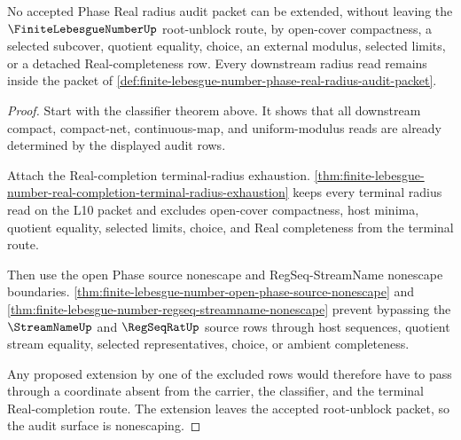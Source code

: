 \begin{theorem}
\label{thm:finite-lebesgue-number-phase-real-radius-audit-nonescape}
No accepted Phase Real radius audit packet can be extended, without leaving the $\FiniteLebesgueNumberUp$ root-unblock route, by open-cover compactness, a selected subcover, quotient equality, choice, an external modulus, selected limits, or a detached Real-completeness row. Every downstream radius read remains inside the packet of \autoref{def:finite-lebesgue-number-phase-real-radius-audit-packet}.
\end{theorem}
\begin{proof}
Start with the classifier theorem above. It shows that all downstream compact, compact-net, continuous-map, and uniform-modulus reads are already determined by the displayed audit rows.

Attach the Real-completion terminal-radius exhaustion. \autoref{thm:finite-lebesgue-number-real-completion-terminal-radius-exhaustion} keeps every terminal radius read on the L10 packet and excludes open-cover compactness, host minima, quotient equality, selected limits, choice, and Real completeness from the terminal route.

Then use the open Phase source nonescape and RegSeq-StreamName nonescape boundaries. \autoref{thm:finite-lebesgue-number-open-phase-source-nonescape} and \autoref{thm:finite-lebesgue-number-regseq-streamname-nonescape} prevent bypassing the $\StreamNameUp$ and $\RegSeqRatUp$ source rows through host sequences, quotient stream equality, selected representatives, choice, or ambient completeness.

Any proposed extension by one of the excluded rows would therefore have to pass through a coordinate absent from the carrier, the classifier, and the terminal Real-completion route. The extension leaves the accepted root-unblock packet, so the audit surface is nonescaping.
\end{proof}
